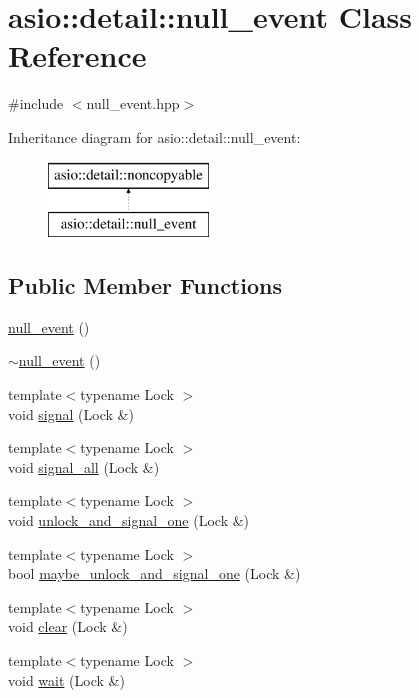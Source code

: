 \hypertarget{classasio_1_1detail_1_1null__event}{}\section{asio\+:\+:detail\+:\+:null\+\_\+event Class Reference}
\label{classasio_1_1detail_1_1null__event}


{\ttfamily \#include $<$null\+\_\+event.\+hpp$>$}

Inheritance diagram for asio\+:\+:detail\+:\+:null\+\_\+event\+:\begin{figure}[H]
\begin{center}
\leavevmode
\includegraphics[height=2.000000cm]{classasio_1_1detail_1_1null__event}
\end{center}
\end{figure}
\subsection*{Public Member Functions}
\begin{DoxyCompactItemize}
\item 
\hyperlink{classasio_1_1detail_1_1null__event_a0c8c322d28fbb58e6041e5706bd17bdc}{null\+\_\+event} ()
\item 
\hyperlink{classasio_1_1detail_1_1null__event_ac9420a0ec1e2cc7270e305fd9d38d994}{$\sim$null\+\_\+event} ()
\item 
{\footnotesize template$<$typename Lock $>$ }\\void \hyperlink{classasio_1_1detail_1_1null__event_a07a2356e5199e7e54b333b7270f4cc35}{signal} (Lock \&)
\item 
{\footnotesize template$<$typename Lock $>$ }\\void \hyperlink{classasio_1_1detail_1_1null__event_a0022cc640d1a1b97ce8ca4c3de362e3a}{signal\+\_\+all} (Lock \&)
\item 
{\footnotesize template$<$typename Lock $>$ }\\void \hyperlink{classasio_1_1detail_1_1null__event_af76813b0a7fbae930412dcdc08070173}{unlock\+\_\+and\+\_\+signal\+\_\+one} (Lock \&)
\item 
{\footnotesize template$<$typename Lock $>$ }\\bool \hyperlink{classasio_1_1detail_1_1null__event_a9dc079f6ba2be2c32acbb33996162199}{maybe\+\_\+unlock\+\_\+and\+\_\+signal\+\_\+one} (Lock \&)
\item 
{\footnotesize template$<$typename Lock $>$ }\\void \hyperlink{classasio_1_1detail_1_1null__event_a6ad86da934e32d8856398cbc52efdfed}{clear} (Lock \&)
\item 
{\footnotesize template$<$typename Lock $>$ }\\void \hyperlink{classasio_1_1detail_1_1null__event_a1283b11b26d09def9d828760903ed74f}{wait} (Lock \&)
\end{DoxyCompactItemize}


